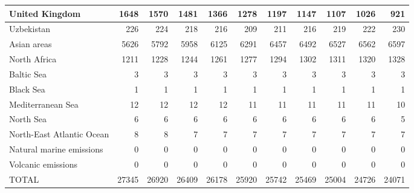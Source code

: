 \begin{table}
\begin{tabular}{|l|r|r|r|r|r|r|r|r|r|r|}
                United Kingdom&   1648&   1570&   1481&   1366&   1278&   1197&   1147&   1107&   1026&    921\\\hline
                    Uzbekistan&    226&    224&    218&    216&    209&    211&    216&    219&    222&    230\\\hline
                   Asian areas&   5626&   5792&   5958&   6125&   6291&   6457&   6492&   6527&   6562&   6597\\\hline
                  North Africa&   1211&   1228&   1244&   1261&   1277&   1294&   1302&   1311&   1320&   1328\\\hline
                    Baltic Sea&      3&      3&      3&      3&      3&      3&      3&      3&      3&      3\\\hline
                     Black Sea&      1&      1&      1&      1&      1&      1&      1&      1&      1&      1\\\hline
             Mediterranean Sea&     12&     12&     12&     12&     11&     11&     11&     11&     11&     10\\\hline
                     North Sea&      6&      6&      6&      6&      6&      6&      6&      6&      6&      5\\\hline
     North-East Atlantic Ocean&      8&      8&      7&      7&      7&      7&      7&      7&      7&      7\\\hline
      Natural marine emissions&      0&      0&      0&      0&      0&      0&      0&      0&      0&      0\\\hline
            Volcanic emissions&      0&      0&      0&      0&      0&      0&      0&      0&      0&      0\\\hline\hline
                         TOTAL&  27345&  26920&  26409&  26178&  25920&  25742&  25469&  25004&  24726&  24071\\\hline
 \end{tabular}
 \end{table}
 
